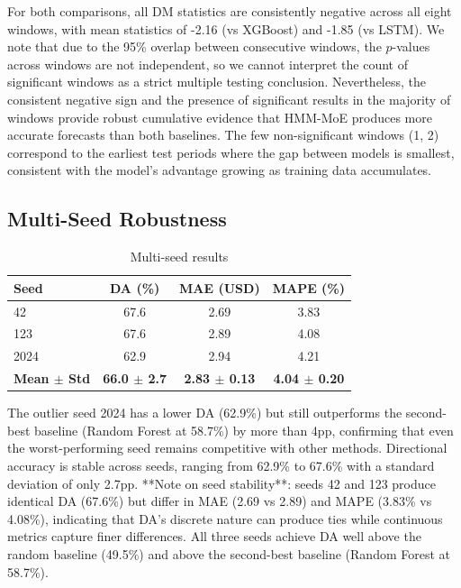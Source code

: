 \documentclass[3p,times]{elsarticle}
\begin{document}
For both comparisons, all DM statistics are consistently negative across all eight windows, with mean statistics of -2.16 (vs XGBoost) and -1.85 (vs LSTM). We note that due to the 95\% overlap between consecutive windows, the $p$-values across windows are not independent, so we cannot interpret the count of significant windows as a strict multiple testing conclusion. Nevertheless, the consistent negative sign and the presence of significant results in the majority of windows provide robust cumulative evidence that HMM-MoE produces more accurate forecasts than both baselines. The few non-significant windows (1, 2) correspond to the earliest test periods where the gap between models is smallest, consistent with the model's advantage growing as training data accumulates.

\subsection{Multi-Seed Robustness}
\label{sec:multiseed}

\begin{table}[htbp]
\centering
\caption{Multi-seed results}
\label{tab:multiseed}
\begin{tabular}{lccc}
\toprule
Seed & DA (\%) & MAE (USD) & MAPE (\%) \\
\midrule
42 & 67.6 & 2.69 & 3.83 \\
123 & 67.6 & 2.89 & 4.08 \\
2024 & 62.9 & 2.94 & 4.21 \\
\midrule
\textbf{Mean $\pm$ Std} & \textbf{66.0 $\pm$ 2.7} & \textbf{2.83 $\pm$ 0.13} & \textbf{4.04 $\pm$ 0.20} \\
\bottomrule
\end{tabular}
\end{table}

The outlier seed 2024 has a lower DA (62.9\%) but still outperforms the second-best baseline (Random Forest at 58.7\%) by more than 4pp, confirming that even the worst-performing seed remains competitive with other methods. Directional accuracy is stable across seeds, ranging from 62.9\% to 67.6\% with a standard deviation of only 2.7pp. **Note on seed stability**: seeds 42 and 123 produce identical DA (67.6\%) but differ in MAE (2.69 vs 2.89) and MAPE (3.83\% vs 4.08\%), indicating that DA's discrete nature can produce ties while continuous metrics capture finer differences. All three seeds achieve DA well above the random baseline (49.5\%) and above the second-best baseline (Random Forest at 58.7\%).
\end{document}
